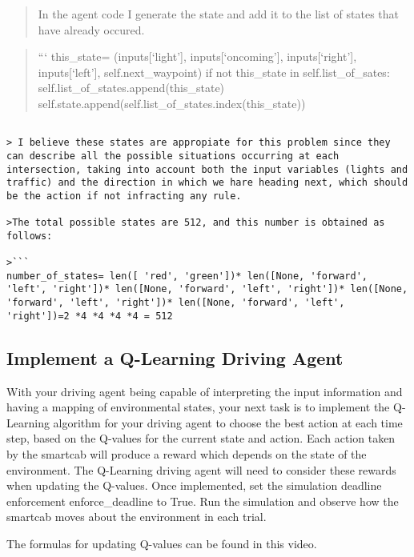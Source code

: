 \documentclass[11pt]{article}
\begin{document}
\begin{quote}
In the agent code I generate the state and add it to the list of states
that have already occured.
\end{quote}

\begin{quote}
``` this\_state= (inputs{[}`light'{]}, inputs{[}`oncoming'{]},
inputs{[}`right'{]}, inputs{[}`left'{]}, self.next\_waypoint) if not
this\_state in self.list\_of\_sates:
self.list\_of\_states.append(this\_state)
self.state.append(self.list\_of\_states.index(this\_state))
\end{quote}

\begin{verbatim}

> I believe these states are appropiate for this problem since they can describe all the possible situations occurring at each intersection, taking into account both the input variables (lights and traffic) and the direction in which we hare heading next, which should be the action if not infracting any rule.

>The total possible states are 512, and this number is obtained as follows: 

>``` 
number_of_states= len([ 'red', 'green'])* len([None, 'forward', 'left', 'right'])* len([None, 'forward', 'left', 'right'])* len([None, 'forward', 'left', 'right'])* len([None, 'forward', 'left', 'right'])=2 *4 *4 *4 *4 = 512 
\end{verbatim}

    \subsection{Implement a Q-Learning Driving
Agent}\label{implement-a-q-learning-driving-agent}

With your driving agent being capable of interpreting the input
information and having a mapping of environmental states, your next task
is to implement the Q-Learning algorithm for your driving agent to
choose the best action at each time step, based on the Q-values for the
current state and action. Each action taken by the smartcab will produce
a reward which depends on the state of the environment. The Q-Learning
driving agent will need to consider these rewards when updating the
Q-values. Once implemented, set the simulation deadline enforcement
enforce\_deadline to True. Run the simulation and observe how the
smartcab moves about the environment in each trial.

The formulas for updating Q-values can be found in this video.
\end{document}
